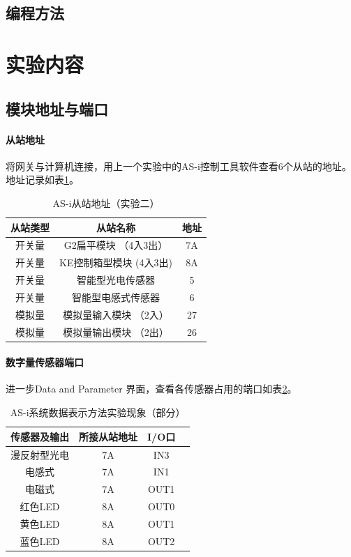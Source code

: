 \subsection{编程方法}
\section{实验内容}
\subsection{模块地址与端口}
\paragraph{从站地址} 将网关与计算机连接，用上一个实验中的AS-i控制工具软件查看6个从站的地址。地址记录如表\ref{tab:address}。

\begin{table}[htbp]
\centering
\begin{tabular}{|c|c|c|}
	\hline
	从站类型 & 从站名称 & 地址 \\
	\hline
	开关量 & G2扁平模块 （4入3出） & 7A \\
	开关量 & KE控制箱型模块 (4入3出) & 8A \\
	开关量 & 智能型光电传感器 & 5 \\
	开关量 & 智能型电感式传感器 & 6 \\
	模拟量 & 模拟量输入模块 （2入） & 27 \\
	模拟量 & 模拟量输出模块 （2出） & 26 \\
	\hline
\end{tabular}
\caption{AS-i从站地址（实验二）}
\label{tab:address}
\end{table}

\paragraph{数字量传感器端口} 进一步{\ttfamily Data and Parameter} 界面，查看各传感器占用的端口如表\ref{tab:port}。

\begin{table}[htbp]
\centering
\begin{tabular}{|c|c|c|c|}
	\hline
	传感器及输出 & 所接从站地址 & I/O口 \\
	\hline
	漫反射型光电 & 7A & IN3 \\
	电感式 & 7A & IN1 \\
	电磁式 & 7A & OUT1 \\
	红色LED & 8A & OUT0 \\
	黄色LED & 8A & OUT1 \\
	蓝色LED & 8A & OUT2 \\
	\hline
\end{tabular}
\caption{AS-i系统数据表示方法实验现象（部分）}
\label{tab:port}
\end{table}

